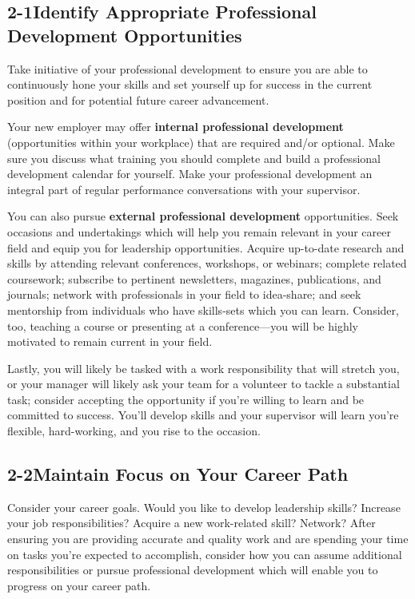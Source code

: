 \pagebreak \subsection*{2-1\quad Identify Appropriate Professional Development Opportunities}

Take initiative of your professional development to ensure you are able to continuously hone your skills and set yourself up for success in the current position and for potential future career advancement.

Your new employer may offer \textbf{internal professional development} (opportunities within your workplace) that are required and/or optional. Make sure you discuss what training you should complete and build a professional development calendar for yourself. Make your professional development an integral part of regular performance conversations with your supervisor.

You can also pursue \textbf{external professional development} opportunities. Seek occasions and undertakings which will help you remain relevant in your career field and equip you for leadership opportunities. Acquire up-to-date research and skills by attending relevant conferences, workshops, or webinars; complete related coursework; subscribe to pertinent newsletters, magazines, publications, and journals; network with professionals in your field to idea-share; and seek mentorship from individuals who have skills-sets which you can learn. Consider, too, teaching a course or presenting at a conference—you will be highly motivated to remain current in your field.

Lastly, you will likely be tasked with a work responsibility that will stretch you, or your manager will likely ask your team for a volunteer to tackle a substantial task; consider accepting the opportunity if you’re willing to learn and be committed to success. You’ll develop skills and your supervisor will learn you’re flexible, hard-working, and you rise to the occasion.
\pagebreak \subsection*{2-2\quad Maintain Focus on Your Career Path}

Consider your career goals. Would you like to develop leadership skills? Increase your job responsibilities? Acquire a new work-related skill? Network? After ensuring you are providing accurate and quality work and are spending your time on tasks you’re expected to accomplish, consider how you can assume additional responsibilities or pursue professional development which will enable you to progress on your career path.


